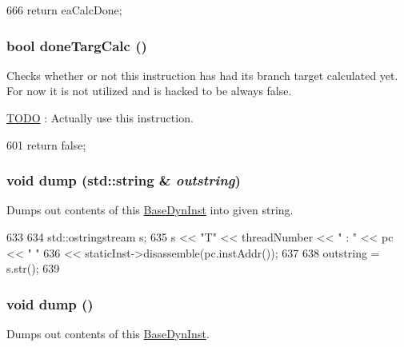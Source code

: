 \begin{DoxyCode}
666 { return eaCalcDone; }
\end{DoxyCode}
\hypertarget{classInOrderDynInst_a9a56f3bdfd0d5b331356265c62556516}{
\subsubsection[{doneTargCalc}]{\setlength{\rightskip}{0pt plus 5cm}bool doneTargCalc ()}}
\label{classInOrderDynInst_a9a56f3bdfd0d5b331356265c62556516}
Checks whether or not this instruction has had its branch target calculated yet. For now it is not utilized and is hacked to be always false. \begin{Desc}
\item[\hyperlink{todo__todo000018}{TODO}]: Actually use this instruction. \end{Desc}



\begin{DoxyCode}
601 { return false; }
\end{DoxyCode}
\hypertarget{classInOrderDynInst_a5d337b0f151368459d1a95a6470f18ca}{
\subsubsection[{dump}]{\setlength{\rightskip}{0pt plus 5cm}void dump (std::string \& {\em outstring})}}
\label{classInOrderDynInst_a5d337b0f151368459d1a95a6470f18ca}
Dumps out contents of this \hyperlink{classBaseDynInst}{BaseDynInst} into given string. 


\begin{DoxyCode}
633 {
634     std::ostringstream s;
635     s << "T" << threadNumber << " : " << pc << " "
636       << staticInst->disassemble(pc.instAddr());
637 
638     outstring = s.str();
639 }
\end{DoxyCode}
\hypertarget{classInOrderDynInst_accd2600060dbaee3a3b41aed4034c63c}{
\subsubsection[{dump}]{\setlength{\rightskip}{0pt plus 5cm}void dump ()}}
\label{classInOrderDynInst_accd2600060dbaee3a3b41aed4034c63c}
Dumps out contents of this \hyperlink{classBaseDynInst}{BaseDynInst}. 


